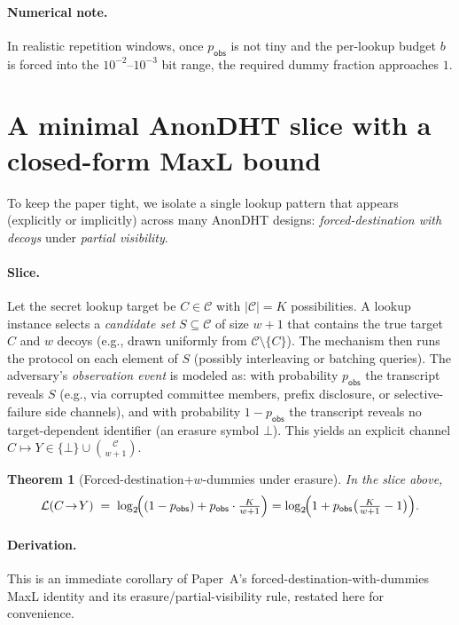 \documentclass[11pt]{article}
\newcommand{\MaxL}{\mathcal{L}}
\newcommand{\logtwo}{\log_2}
\newcommand{\C}{\mathcal{C}} %
\newtheorem{theorem}{Theorem}
\begin{document}
\paragraph{Numerical note.} In realistic repetition windows, once $p_{\mathsf{obs}}$ is not tiny and the per-lookup budget $b$ is forced into the $10^{-2}$--$10^{-3}$ bit range, the required dummy fraction approaches $1$.
\cite{series:bossfightBaddendum}







\section{A minimal AnonDHT slice with a closed-form MaxL bound}\label{sec:minislice}
To keep the paper tight, we isolate a single lookup pattern that appears (explicitly or implicitly) across many AnonDHT designs:
\emph{forced-destination with decoys} under \emph{partial visibility}.

\paragraph{Slice.}
Let the secret lookup target be $C\in\C$ with $|\C|=K$ possibilities.
A lookup instance selects a \emph{candidate set} $S\subseteq \C$ of size $w{+}1$ that contains the true target $C$ and $w$ decoys (e.g., drawn uniformly from $\C\setminus\{C\}$).
The mechanism then runs the protocol on each element of $S$ (possibly interleaving or batching queries).
The adversary's \emph{observation event} is modeled as:
with probability $p_{\mathsf{obs}}$ the transcript reveals $S$ (e.g., via corrupted committee members, prefix disclosure, or selective-failure side channels),
and with probability $1-p_{\mathsf{obs}}$ the transcript reveals no target-dependent identifier (an erasure symbol $\bot$).
This yields an explicit channel $C\mapsto Y\in \{\bot\}\cup \binom{\C}{w{+}1}$.

\begin{theorem}[Forced-destination+$w$-dummies under erasure]\label{thm:forced_erasure}
In the slice above,
\[
\MaxL(C\!\to\!Y)\;=\;\logtwo\!\Bigl((1-p_{\mathsf{obs}})+p_{\mathsf{obs}}\cdot \tfrac{K}{w{+}1}\Bigr)
=\logtwo\!\Bigl(1+p_{\mathsf{obs}}\bigl(\tfrac{K}{w{+}1}-1\bigr)\Bigr).
\]
\end{theorem}
\paragraph{Derivation.}
This is an immediate corollary of Paper~A's forced-destination-with-dummies MaxL identity and its erasure/partial-visibility rule, restated here for convenience.
\end{document}
